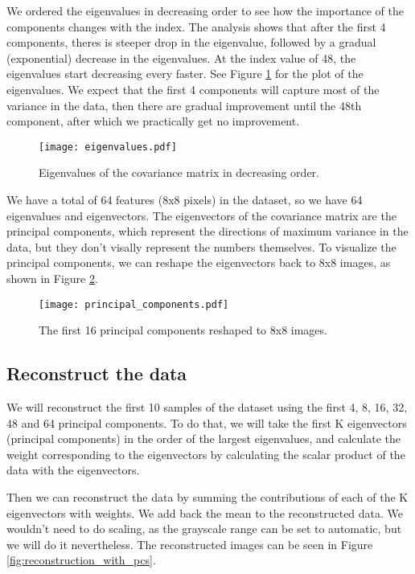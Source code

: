 \documentclass{article}
\begin{document}
We ordered the eigenvalues in decreasing order to see
how the importance of the components changes with the index.
The analysis shows that after the first 4 components,
theres is steeper drop in the eigenvalue,
followed by a gradual (exponential) decrease in the eigenvalues.
At the index value of 48, the eigenvalues start decreasing every faster.
See Figure \ref{fig:eigenvalues} for the plot of the eigenvalues.
We expect that the first 4 components will capture most of the variance in the data,
then there are gradual improvement until the 48th component,
after which we practically get no improvement.

\begin{figure}[ht!]
    \centering
    \texttt{[image: eigenvalues.pdf]}
    \caption{Eigenvalues of the covariance matrix in decreasing order.}
    \label{fig:eigenvalues}
\end{figure}

We have a total of 64 features (8x8 pixels) in the dataset,
so we have 64 eigenvalues and eigenvectors.
The eigenvectors of the covariance matrix are the principal components,
which represent the directions of maximum variance in the data,
but they don't visally represent the numbers themselves.
To visualize the principal components,
we can reshape the eigenvectors back to 8x8 images, as shown in Figure \ref{fig:principal_components}.

\begin{figure}[ht!]
    \centering
    \texttt{[image: principal\_components.pdf]}
    \caption{The first 16 principal components reshaped to 8x8 images.}
    \label{fig:principal_components}
\end{figure}

\subsection{Reconstruct the data}
We will reconstruct the first 10 samples of the dataset using the first
4, 8, 16, 32, 48 and 64 principal components.
To do that, we will take the first K eigenvectors (principal components)
in the order of the largest eigenvalues,
and calculate the weight corresponding to the eigenvectors
by calculating the scalar product of the data with the eigenvectors.

Then we can reconstruct the data by
summing the contributions of each of the K eigenvectors with weights.
We add back the mean to the reconstructed data.
We wouldn't need to do scaling, as the grayscale range can be set to automatic,
but we will do it nevertheless.
The reconstructed images can be seen in Figure \ref{fig:reconstruction_with_pcs}.
\end{document}
